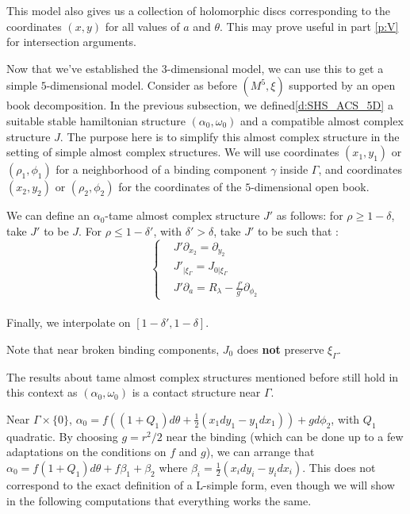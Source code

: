 \documentclass[../main.tex]{subfiles}
\begin{document}
\begin{remark}
This model also gives us a collection of holomorphic discs corresponding to the coordinates $(x,y)$ for all values of $a$ and $\theta$. This may prove useful in part \ref{p:V} for intersection arguments.
\end{remark}

Now that we've established the 3-dimensional model, we can use this to get a simple $5$-dimensional model. Consider as before $(M^5,\xi)$ supported by an open book decomposition. In the previous subsection, we defined\ref{d:SHS_ACS_5D} a suitable stable hamiltonian structure $(\alpha_0,\omega_0)$ and a compatible almost complex structure $J$. The purpose here is to simplify this almost complex structure in the setting of simple almost complex structures. We will use coordinates $(x_1,y_1)$ or $(\rho_1,\phi_1)$ for a neighborhood of a binding component $\gamma$ inside $\Gamma$, and coordinates $(x_2,y_2)$ or $(\rho_2,\phi_2)$ for the coordinates of the $5$-dimensional open book. 

\begin{lemma}\label{l:simple_acs_5D}
We can define an $\alpha_0$-tame almost complex structure $J'$ as follows: for $\rho\geq 1-\delta$, take $J'$ to be $J$. For $\rho \leq 1-\delta'$, with $\delta'> \delta$, take $J'$ to be such that :
\begin{equation}
\left\{
    \begin{array}{ll}
        & J'\partial_{x_2} = \partial_{y_2} \\
        & J'_{|\xi_\Gamma} = J_{0|\xi_\Gamma} \\
        & J'\partial_a = R_\lambda - \frac{f'}{g'}\partial_{\phi_2}
    \end{array}
\right.
\end{equation}
\\
Finally, we interpolate on $[1-\delta ',1-\delta]$.
\end{lemma}

\begin{remark}
Note that near broken binding components, $J_0$ does \textbf{not} preserve $\xi_{\Gamma}$.
\end{remark}

\begin{remark}
The results about tame almost complex structures mentioned before still hold in this context as $(\alpha_0,\omega_0)$ is a contact structure near $\Gamma$. 
\end{remark}

\begin{remark}
Near $\Gamma\times \{0\}$, $\alpha_0 = f((1+ Q_1)d\theta + \frac{1}{2}(x_1dy_1 -y_1dx_1)) + gd\phi_2$, with $Q_1$ quadratic. By choosing $g = r^2/2$ near the binding (which can be done up to a few adaptations on the conditions on $f$ and $g$), we can arrange that $\alpha_0 = f(1+Q_1)d\theta + f\beta_1 + \beta_2$ where $\beta_i = \frac{1}{2}(x_idy_i - y_idx_i)$. This does not correspond to the exact definition of a L-simple form, even though we will show in the following computations that everything works the same. 
\end{remark}
\end{document}
